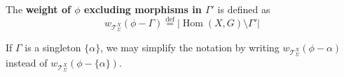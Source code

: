 \begin{definition}
    \label{def:weight_excluding}
    The \textbf{weight of \( \phi \) excluding morphisms in \( \Gamma' \)} is defined as
    \[
        w_{\mathcal{T}_\Sigma^X}(\phi - \Gamma) \overset{\operatorname{def}}{=} \left| \operatorname{Hom}(X, G) \mathop{\setminus} \Gamma' \right|
    \]
\end{definition}

\begin{remark}
    If \( \Gamma \) is a singleton \( \{ \alpha \} \), we may simplify the notation by writing \( w_{\mathcal{T}_\Sigma^X}(\phi - \alpha) \) instead of \( w_{\mathcal{T}_\Sigma^X}(\phi - \{ \alpha \}) \).
\end{remark}

